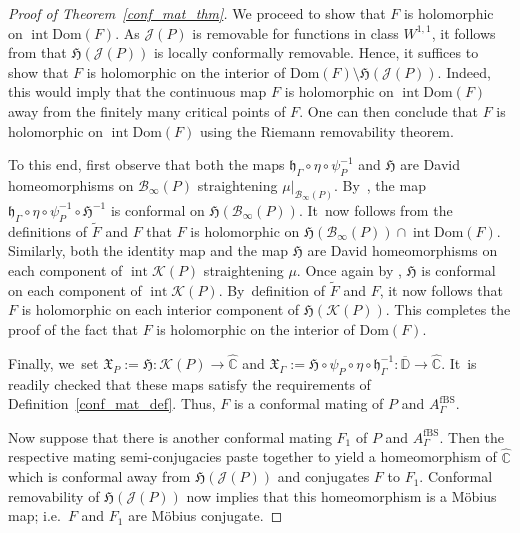 \documentclass[10pt,a4paper]{amsart}
\newcommand{\ie}{i.e.\ }
\theoremstyle{definition}
\theoremstyle{remark}
\newcommand{\C}{\mathbb{C}}
\newcommand{\D}{\mathbb{D}}
\DeclareMathOperator{\Int}{int}
\begin{document}
\begin{proof}[Proof of Theorem~\ref{conf_mat_thm}]
We proceed to show that $F$ is holomorphic on $\Int{\mathrm{Dom}(F)}$.
As $\mathcal{J}(P)$ is removable for functions in class $W^{1,1}$, it follows from \cite[Th.\,2.7]{LMMN} that $\mathfrak{H}(\mathcal{J}(P))$ is locally conformally removable. Hence, it suffices to show that $F$ is holomorphic on the interior of $\mathrm{Dom}(F)\setminus\mathfrak{H}(\mathcal{J}(P))$. Indeed, this would imply that the continuous map $F$ is holomorphic on $\Int{\mathrm{Dom}(F)}$ away from the finitely many critical points of $F$. One can then conclude that $F$ is holomorphic on $\Int{\mathrm{Dom}(F)}$ using the Riemann removability theorem.

To this end, first observe that both the maps $\mathfrak{h}_\Gamma\circ\eta\circ\psi_P^{-1}$ and $\mathfrak{H}$ are David homeomorphisms on $\mathcal{B}_\infty(P)$ straightening $\mu\vert_{\mathcal{B}_\infty(P)}$. By~\cite[Th.\,20.4.19, p.\,565]{AIM09}, the map $\mathfrak{h}_\Gamma\circ\eta\circ\psi_P^{-1}\circ\mathfrak{H}^{-1}$ is conformal on $\mathfrak{H}(\mathcal{B}_\infty(P))$. It~now follows from the definitions of $\widetilde{F}$ and $F$ that $F$ is holomorphic on $\mathfrak{H}(\mathcal{B}_\infty(P))\cap\Int{\mathrm{Dom}(F)}$. Similarly, both the identity map and the map $\mathfrak{H}$ are David homeomorphisms on each component of $\Int{\mathcal{K}(P)}$ straightening $\mu$. Once again by \cite[Th.\,20.4.19, p.\,565]{AIM09}, $\mathfrak{H}$ is conformal on each component of $\Int{\mathcal{K}(P)}$. By~definition of $\widetilde{F}$ and $F$, it now follows that $F$ is holomorphic on each interior component of $\mathfrak{H}(\mathcal{K}(P))$.
This completes the proof of the fact that $F$ is holomorphic on the interior of $\mathrm{Dom}(F)$.

Finally, we~set $\mathfrak{X}_P:=\mathfrak{H}:\mathcal{K}(P)\to\widehat{\C}$ and $\mathfrak{X}_\Gamma:=\mathfrak{H}\circ\psi_P\circ\eta\circ\mathfrak{h}_\Gamma^{-1}:\overline{\D}\to\widehat{\C}$. It~is readily checked that these maps satisfy the requirements of Definition~\ref{conf_mat_def}. Thus, $F$ is a conformal mating of $P$ and $A_{\Gamma}^{\mathrm{fBS}}$.

Now suppose that there is another conformal mating $F_1$ of $P$ and $A_{\Gamma}^{\mathrm{fBS}}$. Then the respective mating semi-conjugacies paste together to yield a homeomorphism of $\widehat{\C}$ which is conformal away from $\mathfrak{H}(\mathcal{J}(P))$ and conjugates $F$ to $F_1$. Conformal removability of $\mathfrak{H}(\mathcal{J}(P))$ now implies that this homeomorphism is a Möbius map; \ie $F$ and $F_1$ are Möbius conjugate.
\end{proof}
\end{document}
